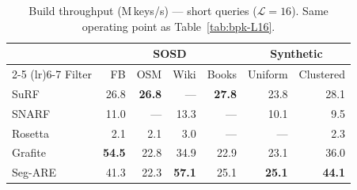 \begin{table}[H]
    \centering
    \small
    \begin{tabular}{@{}lrrrrrr@{}}
        \toprule
        & \multicolumn{4}{c}{SOSD} & \multicolumn{2}{c}{Synthetic} \\
        \cmidrule(lr){2-5} \cmidrule(lr){6-7}
        Filter & FB & OSM & Wiki & Books & Uniform & Clustered \\
        \midrule
        SuRF    & 26.8                  & \textbf{26.8}         & \textnormal{---} & \textbf{27.8}         & 23.8                  & 28.1 \\
        SNARF   & 11.0                  & \textnormal{---}       & 13.3             & \textnormal{---}       & 10.1                  & 9.5  \\
        Rosetta & 2.1                   & 2.1                   & 3.0              & \textnormal{---}       & \textnormal{---}       & 2.3  \\
        Grafite & \textbf{54.5}         & 22.8                  & 34.9             & 22.9                  & 23.1                  & 36.0 \\
        Seg-ARE & 41.3                  & 22.3                  & \textbf{57.1}    & 25.1                  & \textbf{25.1}         & \textbf{44.1} \\
        \bottomrule
    \end{tabular}
    \caption{Build throughput (M\,keys/s) --- short queries ($\mathcal{L}=16$).
             Same operating point as Table~\ref{tab:bpk-L16}.}
    \label{tab:throughput-L16}
\end{table}

